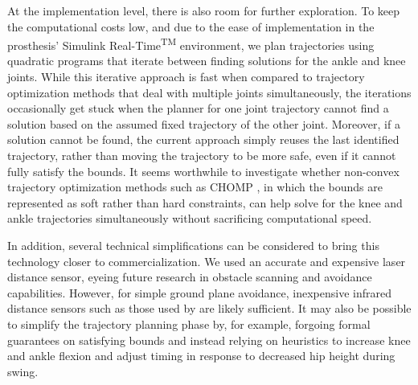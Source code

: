 At the implementation level, there is also room for further exploration. To keep
the computational costs low, and due to the ease of implementation in the
prosthesis' Simulink Real-Time\textsuperscript{TM} environment, we plan
trajectories using quadratic programs that iterate between finding solutions for
the ankle and knee joints.  While this iterative approach is fast when compared
to trajectory optimization methods that deal with multiple joints
simultaneously, the iterations occasionally get stuck when the planner for one
joint trajectory cannot find a solution based on the assumed fixed trajectory of
the other joint. Moreover, if a solution cannot be found, the current approach
simply reuses the last identified trajectory, rather than moving the trajectory
to be more safe, even if it cannot fully satisfy the bounds. It seems worthwhile
to investigate whether non-convex trajectory optimization methods such as CHOMP
\citep{ratliff2009chomp}, in which the bounds are represented as soft rather
than hard constraints, can help solve for the knee and ankle trajectories
simultaneously without sacrificing computational speed.

In addition, several technical simplifications can be considered to bring this
technology closer to commercialization. We used an accurate and expensive laser
distance sensor, eyeing future research in obstacle scanning and avoidance
capabilities. However, for simple ground plane avoidance, inexpensive infrared
distance sensors such as those used by \citet{scandaroli2009estimation} are
likely sufficient. It may also be possible to simplify the trajectory planning
phase by, for example, forgoing formal guarantees on satisfying bounds and
instead relying on heuristics to increase knee and ankle flexion and adjust
timing in response to decreased hip height during swing.
